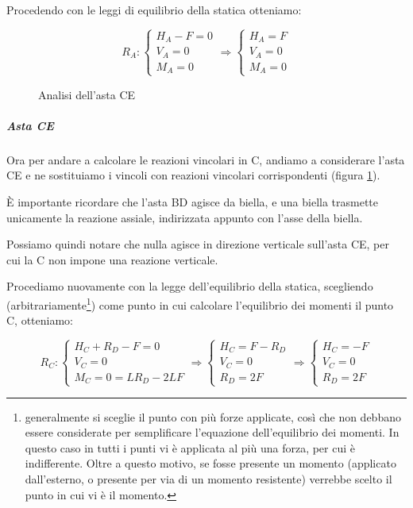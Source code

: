 \documentclass[main.tex]{subfiles}
\begin{document}
Procedendo con le leggi di equilibrio della statica otteniamo:

\[
R_A : \begin{cases}
H_A - F = 0\\
V_A = 0\\
M_A = 0
\end{cases}
\Longrightarrow \begin{cases}
H_A = F\\
V_A = 0\\
M_A = 0
\end{cases}
\]

\begin{figure}[htb]
\centering
\resizebox{.5\textwidth}{!}{}
\caption{Analisi dell'asta CE}
\label{vincoli_asta_CE_1}
\end{figure}

\subparagraph{Asta CE}
Ora per andare a calcolare le reazioni vincolari in C, andiamo a considerare l'asta CE e ne sostituiamo i vincoli con reazioni vincolari corrispondenti (figura \ref{vincoli_asta_CE_1}).

È importante ricordare che l'asta BD agisce da biella, e una biella trasmette unicamente la reazione assiale, indirizzata appunto con l'asse della biella.

Possiamo quindi notare che nulla agisce in direzione verticale sull'asta CE, per cui la C non impone una reazione verticale.

Procediamo nuovamente con la legge dell'equilibrio della statica, scegliendo (arbitrariamente\footnote{generalmente si sceglie il punto con più forze applicate, così che non debbano essere considerate per semplificare l'equazione dell'equilibrio dei momenti. In questo caso in tutti i punti vi è applicata al più una forza, per cui è indifferente. Oltre a questo motivo, se fosse presente un momento (applicato dall'esterno, o presente per via di un momento resistente) verrebbe scelto il punto in cui vi è il momento.}) come punto in cui calcolare l'equilibrio dei momenti il punto C, otteniamo:

\[
R_C : \begin{cases}
H_C + R_D - F = 0\\
V_C = 0\\
M_C = 0 = LR_D - 2LF
\end{cases}
\Longrightarrow \begin{cases}
H_C = F - R_D\\
V_C = 0\\
R_D = 2F
\end{cases}
\Longrightarrow \begin{cases}
H_C = -F\\
V_C = 0\\
R_D = 2F
\end{cases}
\]
\end{document}
